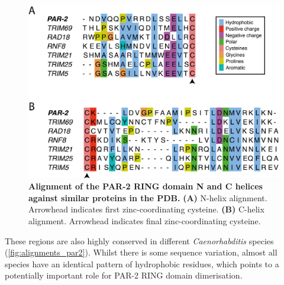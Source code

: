 \documentclass[12pt]{"article"}
\newcommand{\mycaption}[2]{\caption[#1]{\textbf{#1.} #2}}
\begin{document}
\begin{figure}
\includegraphics[scale=1]{alignments_other_rings}
\centering
\mycaption{Alignment of the PAR-2 RING domain N and C helices against similar proteins in the PDB}{
\textbf{(A)} N-helix alignment. Arrowhead indicates first zinc-coordinating cysteine.
\textbf{(B)} C-helix alignment. Arrowhead indicates final zinc-coordinating cysteine.
}
\label{fig:alignments_other_rings}
\end{figure}

These regions are also highly conserved in different \textit{Caenorhabditis} species (\cref{fig:alignments_par2}). Whilst there is some sequence variation, almost all species have an identical pattern of hydrophobic residues, which points to a potentially important role for PAR-2 RING domain dimerisation. \\
\end{document}
